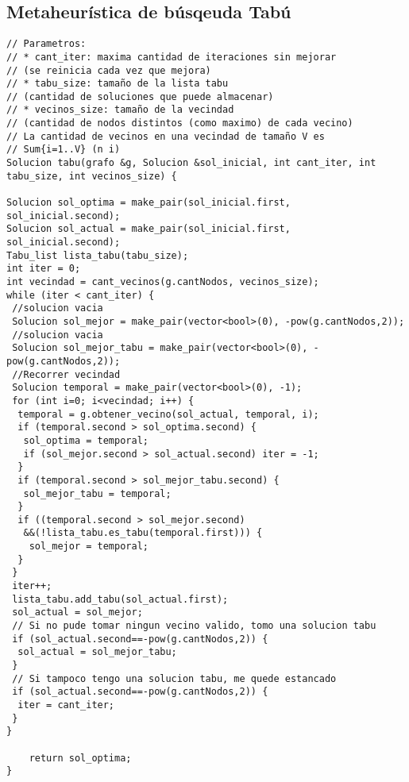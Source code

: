 \subsection{Metaheur\'istica de búsqeuda Tab\'u}
\begin{lstlisting}
// Parametros:
// * cant_iter: maxima cantidad de iteraciones sin mejorar
// (se reinicia cada vez que mejora)
// * tabu_size: tamaño de la lista tabu
// (cantidad de soluciones que puede almacenar)
// * vecinos_size: tamaño de la vecindad
// (cantidad de nodos distintos (como maximo) de cada vecino)
// La cantidad de vecinos en una vecindad de tamaño V es
// Sum{i=1..V} (n i)
Solucion tabu(grafo &g, Solucion &sol_inicial, int cant_iter, int tabu_size, int vecinos_size) {

Solucion sol_optima = make_pair(sol_inicial.first, sol_inicial.second);
Solucion sol_actual = make_pair(sol_inicial.first, sol_inicial.second);
Tabu_list lista_tabu(tabu_size);
int iter = 0;
int vecindad = cant_vecinos(g.cantNodos, vecinos_size);
while (iter < cant_iter) {
 //solucion vacia
 Solucion sol_mejor = make_pair(vector<bool>(0), -pow(g.cantNodos,2));
 //solucion vacia
 Solucion sol_mejor_tabu = make_pair(vector<bool>(0), -pow(g.cantNodos,2));
 //Recorrer vecindad
 Solucion temporal = make_pair(vector<bool>(0), -1);
 for (int i=0; i<vecindad; i++) {
  temporal = g.obtener_vecino(sol_actual, temporal, i);
  if (temporal.second > sol_optima.second) {
   sol_optima = temporal;
   if (sol_mejor.second > sol_actual.second) iter = -1;
  }
  if (temporal.second > sol_mejor_tabu.second) {
   sol_mejor_tabu = temporal;
  }
  if ((temporal.second > sol_mejor.second)
   &&(!lista_tabu.es_tabu(temporal.first))) {
    sol_mejor = temporal;
  }
 }
 iter++;
 lista_tabu.add_tabu(sol_actual.first);
 sol_actual = sol_mejor;
 // Si no pude tomar ningun vecino valido, tomo una solucion tabu
 if (sol_actual.second==-pow(g.cantNodos,2)) {
  sol_actual = sol_mejor_tabu;
 }
 // Si tampoco tengo una solucion tabu, me quede estancado
 if (sol_actual.second==-pow(g.cantNodos,2)) {
  iter = cant_iter;
 }
}

	return sol_optima;
}

\end{lstlisting}

